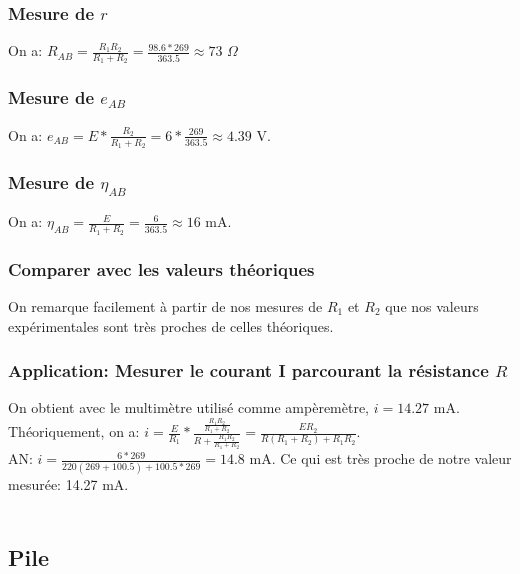 \documentclass{scrartcl}
\begin{document}
			\subsubsection{Mesure de $r$}
			
				On a: $R_{AB} = \frac{R_1 R_2}{R_1 + R_2} = \frac{98.6 * 269}{363.5} \approx 73$ $\Omega$
			
			\subsubsection{Mesure de $e_{AB}$}
			
				On a: $e_{AB} = E * \frac{R_2}{R_1 + R_2} = 6 * \frac{269}{363.5} \approx 4.39$ V.
			
			\subsubsection{Mesure de $\eta_{AB}$}
			
				On a: $\eta_{AB} = \frac{E}{R_1 + R_2} = \frac{6}{363.5} \approx 16$ mA.
			
			\subsubsection{Comparer avec les valeurs théoriques}
			
				On remarque facilement à partir de nos mesures de $R_1$ et $R_2$ que nos valeurs expérimentales sont très proches de celles théoriques.
			
			\subsubsection{Application: Mesurer le courant I parcourant la résistance $R$}
				On obtient avec le multimètre utilisé comme ampèremètre, $i = 14.27$ mA.\\
				Théoriquement, on a: $i = \frac{E}{R_1} * \frac{\frac{R_1 R_2}{R_1 + R_2}}{R + \frac{R_1 R_2}{R_1 + R_2}} = \frac{E R_2}{R(R_1 + R_2) + R_1 R_2}$.\\
				AN: $i = \frac{6 * 269}{220(269 + 100.5) + 100.5 * 269} = 14.8$ mA. Ce qui est très proche de notre valeur mesurée: 14.27 mA.\\\\
			
		\subsection{Pile}
			
\end{document}
